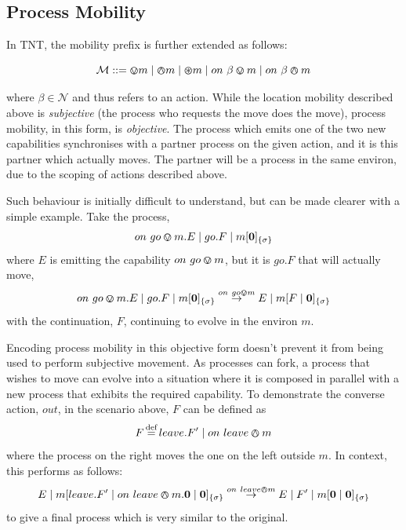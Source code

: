 \subsection{Process Mobility}
\label{procmob}

In TNT, the mobility prefix is further extended as follows:

\begin{equation}
   \text{$\mathcal{M}$} \mathrel{::=} \varovee m \mid \varowedge m \mid \varoast m 
      \mid on\ \beta \varovee m \mid on\ \beta \varowedge m
\end{equation}

\noindent where $\beta \in \mathcal{N}$ and thus refers to an action.
While the location mobility described above is \emph{subjective} (the
process who requests the move does the move), process mobility, in this form,
is \emph{objective}.  The process which emits one of the two new
capabilities synchronises with a partner process on the given action,
and it is this partner which actually moves.  The partner will be a
process in the same environ, due to the scoping of actions described
above.

Such behaviour is initially difficult to understand, but can be made
clearer with a simple example.  Take the process,
\begin{equation}
on\ go \varovee m.E \;|\; go.F \;|\; {m}[ \textbf{0} ]_{\{\sigma\}}
\end{equation}
\noindent where $E$ is emitting the capability $on\ go \varovee m$, but it
is $go.F$ that will actually move,
\begin{equation}
on\ go \varovee m.E \;|\; go.F \;|\; {m}[ \textbf{0} ]_{\{\sigma\}} \stackrel{on\ go \varovee m}{\rightarrow}
E \;|\; {m}[ F \;|\; \textbf{0} ]_{\{\sigma\}}
\end{equation}
with the continuation, $F$, continuing to evolve in the environ $m$.   

Encoding process mobility in this objective form doesn't prevent it from
being used to perform subjective movement.  As processes can fork, a
process that wishes to move can evolve into a situation where it is
composed in parallel with a new process that exhibits the required
capability.  To demonstrate the converse action, $out$, in the scenario
above, $F$ can be defined as
\begin{equation}
F \operatorname{\stackrel{\textrm{def}}{=}} leave.F^\prime \;|\; on\ leave \varowedge m
\end{equation}
where the process on the right moves the one on the left outside $m$.
In context, this performs as follows:
\begin{equation}
E \;|\; {m}[ leave.F^\prime \;|\; on\ leave \varowedge m.\textbf{0} \;|\;
 \textbf{0} ]_{\{\sigma\}} 
\stackrel{on\ leave \varowedge m}{\rightarrow}
E \;|\; F^\prime \;|\; {m}[ \textbf{0} \;|\; \textbf{0} ]_{\{\sigma\}}
\end{equation}
to give a final process which is very similar to the original.


